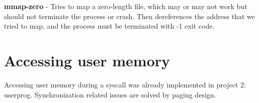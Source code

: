 \textbf{mmap-zero} - Tries to map a zero-length file, which may or may not work but  should not terminate the process or crash.  Then dereferences the address that we tried to map, and the process must be terminated with -1 exit code. 

\section{Accessing user memory}

Accessing user memory during a syscall was already implemented in project 2: userprog. Synchronization related issues are solved by paging design.








	

